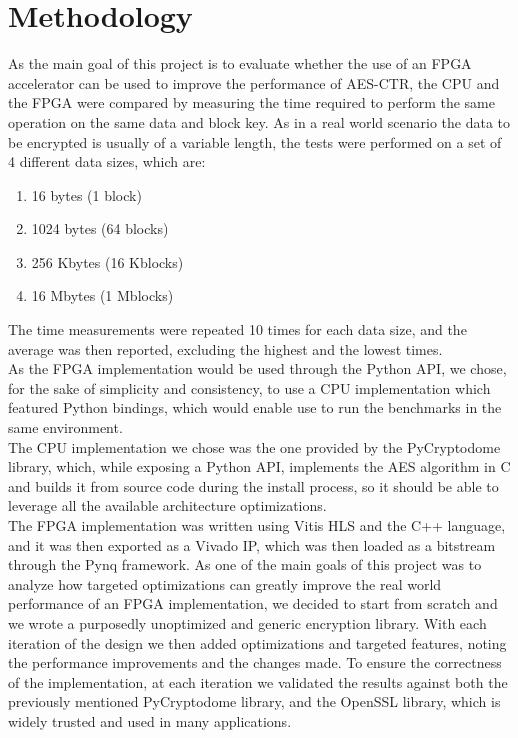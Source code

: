 \documentclass[12pt,oneside,a4paper]{article}
\begin{document}
\section{Methodology} \label{sec:methodology}
As the main goal of this project is to evaluate whether the use of an FPGA accelerator can be used to improve the performance of AES-CTR, the CPU and the FPGA were compared by measuring the time required to perform the same operation on the same data and block key.
As in a real world scenario the data to be encrypted is usually of a variable length, the tests were performed on a set of 4 different data sizes, which are:
\begin{enumerate}
	\item 16 bytes (1 block)
	\item 1024 bytes (64 blocks)
	\item 256 Kbytes (16 Kblocks)
	\item 16 Mbytes (1 Mblocks)
\end{enumerate}
The time measurements were repeated 10 times for each data size, and the average was then reported, excluding the highest and the lowest times.
\\As the FPGA implementation would be used through the Python API, we chose, for the sake of simplicity and consistency, to use a CPU implementation which featured Python bindings, which would enable use to run the benchmarks in the same environment.
\\The CPU implementation we chose was the one provided by the PyCryptodome library, which, while exposing a Python API, implements the AES algorithm in C and builds it from source code during the install process, so it should be able to leverage all the available architecture optimizations.
\\The FPGA implementation was written using Vitis HLS and the C++ language, and it was then exported as a Vivado IP, which was then loaded as a bitstream through the Pynq framework.
As one of the main goals of this project was to analyze how targeted optimizations can greatly improve the real world performance of an FPGA implementation, we decided to start from scratch and we wrote a purposedly unoptimized and generic encryption library.
With each iteration of the design we then added optimizations and targeted features, noting the performance improvements and the changes made.
To ensure the correctness of the implementation, at each iteration we validated the results against both the previously mentioned PyCryptodome library, and the OpenSSL library, which is widely trusted and used in many applications.
\end{document}
